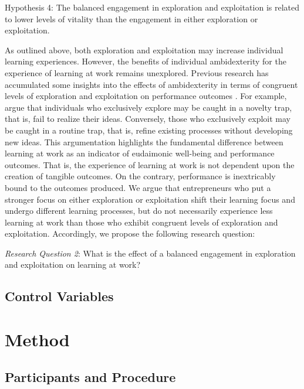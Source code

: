 \documentclass[man]{apa7}
\begin{document}
Hypothesis 4: The balanced engagement in exploration and exploitation is related to lower levels of vitality than the engagement in either exploration or exploitation. \par 

As outlined above, both exploration and exploitation may increase individual learning experiences.
However, the benefits of individual ambidexterity for the experience of learning at work remains unexplored.
Previous research has accumulated some insights into the effects of ambidexterity in terms of congruent levels of exploration and exploitation on performance outcomes \parencite[e.g.,][]{Rosing.2017, Mom.2018}.
For example, \textcite{Rosing.2017} argue that individuals who exclusively explore may be caught in a novelty trap, that is, fail to realize their ideas. 
Conversely, those who exclusively exploit may be caught in a routine trap, that is, refine existing processes without developing new ideas. 
This argumentation highlights the fundamental difference between learning at work as an indicator of eudaimonic well-being and performance outcomes. 
That is, the experience of learning at work is not dependent upon the creation of tangible outcomes. 
On the contrary, performance is inextricably bound to the outcomes produced. 
We argue that entrepreneurs who put a stronger focus on either exploration or exploitation shift their learning focus and undergo different learning processes, but do not necessarily experience less learning at work than those who exhibit congruent levels of exploration and exploitation. 
Accordingly, we propose the following research question: \par 

\textit{Research Question 2}: What is the effect of a balanced engagement in exploration and exploitation on learning at work? \par 

\subsection{Control Variables}

\section{Method}

\subsection{Participants and Procedure} 
\end{document}
